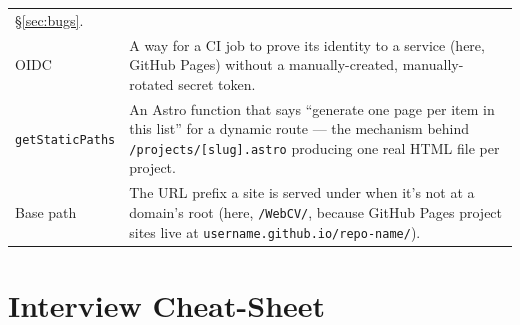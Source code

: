 \documentclass[11pt]{article}
\begin{document}
\begin{longtable}{@{}p{4.0cm}p{10.5cm}@{}}
  \S\ref{sec:bugs}. \\[4pt]
OIDC &
  A way for a CI job to prove its identity to a service (here, GitHub
  Pages) without a manually-created, manually-rotated secret token. \\[4pt]
\texttt{getStaticPaths} &
  An Astro function that says ``generate one page per item in this
  list'' for a dynamic route --- the mechanism behind
  \texttt{/projects/[slug].astro} producing one real HTML file per
  project. \\[4pt]
Base path &
  The URL prefix a site is served under when it's not at a domain's
  root (here, \texttt{/WebCV/}, because GitHub Pages project sites live
  at \texttt{username.github.io/repo-name/}). \\
\bottomrule
\end{longtable}

\section{Interview Cheat-Sheet}
\label{sec:cheatsheet}
\end{document}
